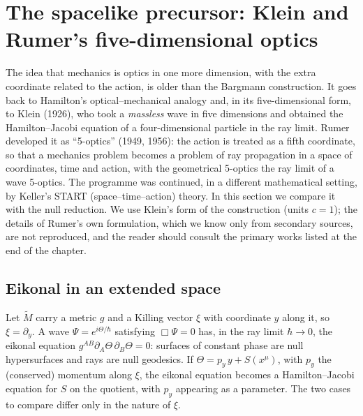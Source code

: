 \section[Klein--Rumer five-dimensional optics]{The spacelike precursor: Klein and Rumer's five-dimensional optics}
\label{sec:nr-rumer}

The idea that mechanics is optics in one more dimension, with the extra
coordinate related to the action, is older than the Bargmann construction. It
goes back to Hamilton's optical--mechanical analogy and, in its five-dimensional
form, to Klein (1926), who took a \emph{massless} wave in five dimensions and
obtained the Hamilton--Jacobi equation of a four-dimensional particle in the ray
limit. Rumer developed it as ``5-optics'' (1949, 1956): the action is
treated as a fifth coordinate, so that a mechanics problem becomes a problem of
ray propagation in a space of coordinates, time and action, with the geometrical
5-optics the ray limit of a wave 5-optics. The programme was continued, in a
different mathematical setting, by Keller's START (space--time--action) theory.
In this section we compare it with the null reduction. We use Klein's form of
the construction (units $c=1$); the details of Rumer's own formulation, which we
know only from secondary sources, are not reproduced, and the reader should
consult the primary works listed at the end of the chapter.

\subsection{Eikonal in an extended space}

Let $\tilde M$ carry a metric $g$ and a Killing vector $\xi$ with coordinate $y$
along it, so $\xi=\partial_y$. A wave $\Psi=e^{i\Theta/\hbar}$ satisfying
$\Box\Psi=0$ has, in the ray limit $\hbar\to0$, the eikonal equation
$g^{AB}\partial_A\Theta\,\partial_B\Theta=0$: surfaces of constant phase are
null hypersurfaces and rays are null geodesics. If $\Theta=p_y\,y+S(x^\mu)$,
with $p_y$ the (conserved) momentum along $\xi$, the eikonal equation becomes a
Hamilton--Jacobi equation for $S$ on the quotient, with $p_y$ appearing as a
parameter. The two cases to compare differ only in the nature of $\xi$.

